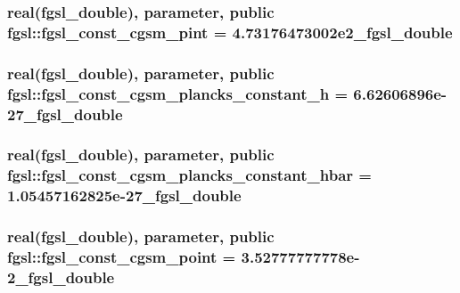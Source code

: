 \hypertarget{classfgsl_a77fc850550f8adbaa35a17890fe1ddb6}{
\subsubsection[{fgsl\-\_\-const\-\_\-cgsm\-\_\-pint}]{\setlength{\rightskip}{0pt plus 5cm}real({\bf fgsl\-\_\-double}), parameter, public fgsl\-::fgsl\-\_\-const\-\_\-cgsm\-\_\-pint = 4.\-73176473002e2\-\_\-fgsl\-\_\-double}}\label{classfgsl_a77fc850550f8adbaa35a17890fe1ddb6}
\hypertarget{classfgsl_ace25c1aaa228a6b88d1f8e8ad1811cc5}{
\subsubsection[{fgsl\-\_\-const\-\_\-cgsm\-\_\-plancks\-\_\-constant\-\_\-h}]{\setlength{\rightskip}{0pt plus 5cm}real({\bf fgsl\-\_\-double}), parameter, public fgsl\-::fgsl\-\_\-const\-\_\-cgsm\-\_\-plancks\-\_\-constant\-\_\-h = 6.\-62606896e-\/27\-\_\-fgsl\-\_\-double}}\label{classfgsl_ace25c1aaa228a6b88d1f8e8ad1811cc5}
\hypertarget{classfgsl_a59a3499a4c13d0d58c0aa1470c6c589a}{
\subsubsection[{fgsl\-\_\-const\-\_\-cgsm\-\_\-plancks\-\_\-constant\-\_\-hbar}]{\setlength{\rightskip}{0pt plus 5cm}real({\bf fgsl\-\_\-double}), parameter, public fgsl\-::fgsl\-\_\-const\-\_\-cgsm\-\_\-plancks\-\_\-constant\-\_\-hbar = 1.\-05457162825e-\/27\-\_\-fgsl\-\_\-double}}\label{classfgsl_a59a3499a4c13d0d58c0aa1470c6c589a}
\hypertarget{classfgsl_a924bd137c2b9e9abffbc4edb9826b398}{
\subsubsection[{fgsl\-\_\-const\-\_\-cgsm\-\_\-point}]{\setlength{\rightskip}{0pt plus 5cm}real({\bf fgsl\-\_\-double}), parameter, public fgsl\-::fgsl\-\_\-const\-\_\-cgsm\-\_\-point = 3.\-52777777778e-\/2\-\_\-fgsl\-\_\-double}}\label{classfgsl_a924bd137c2b9e9abffbc4edb9826b398}
